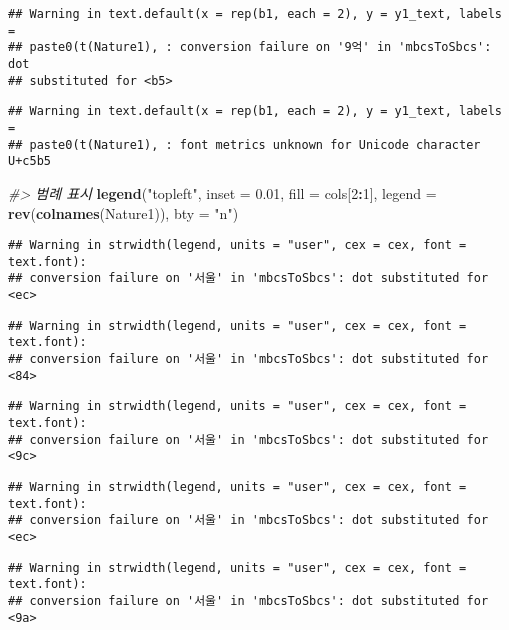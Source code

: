 \documentclass[
]{article}
\newenvironment{Shaded}{\begin{snugshade}}{\end{snugshade}}
\newcommand{\CommentTok}[1]{\textcolor[rgb]{0.56,0.35,0.01}{\textit{#1}}}
\newcommand{\DataTypeTok}[1]{\textcolor[rgb]{0.13,0.29,0.53}{#1}}
\newcommand{\DecValTok}[1]{\textcolor[rgb]{0.00,0.00,0.81}{#1}}
\newcommand{\FloatTok}[1]{\textcolor[rgb]{0.00,0.00,0.81}{#1}}
\newcommand{\KeywordTok}[1]{\textcolor[rgb]{0.13,0.29,0.53}{\textbf{#1}}}
\newcommand{\NormalTok}[1]{#1}
\newcommand{\OperatorTok}[1]{\textcolor[rgb]{0.81,0.36,0.00}{\textbf{#1}}}
\newcommand{\StringTok}[1]{\textcolor[rgb]{0.31,0.60,0.02}{#1}}
\begin{document}
\begin{verbatim}
## Warning in text.default(x = rep(b1, each = 2), y = y1_text, labels =
## paste0(t(Nature1), : conversion failure on '9억' in 'mbcsToSbcs': dot
## substituted for <b5>
\end{verbatim}

\begin{verbatim}
## Warning in text.default(x = rep(b1, each = 2), y = y1_text, labels =
## paste0(t(Nature1), : font metrics unknown for Unicode character U+c5b5
\end{verbatim}

\begin{Shaded}
\begin{Highlighting}[]
\CommentTok{#> 범례 표시}
\KeywordTok{legend}\NormalTok{(}\StringTok{"topleft"}\NormalTok{, }
       \DataTypeTok{inset =} \FloatTok{0.01}\NormalTok{, }
       \DataTypeTok{fill =}\NormalTok{ cols[}\DecValTok{2}\OperatorTok{:}\DecValTok{1}\NormalTok{], }
       \DataTypeTok{legend =} \KeywordTok{rev}\NormalTok{(}\KeywordTok{colnames}\NormalTok{(Nature1)), }
       \DataTypeTok{bty =} \StringTok{"n"}\NormalTok{)}
\end{Highlighting}
\end{Shaded}

\begin{verbatim}
## Warning in strwidth(legend, units = "user", cex = cex, font = text.font):
## conversion failure on '서울' in 'mbcsToSbcs': dot substituted for <ec>
\end{verbatim}

\begin{verbatim}
## Warning in strwidth(legend, units = "user", cex = cex, font = text.font):
## conversion failure on '서울' in 'mbcsToSbcs': dot substituted for <84>
\end{verbatim}

\begin{verbatim}
## Warning in strwidth(legend, units = "user", cex = cex, font = text.font):
## conversion failure on '서울' in 'mbcsToSbcs': dot substituted for <9c>
\end{verbatim}

\begin{verbatim}
## Warning in strwidth(legend, units = "user", cex = cex, font = text.font):
## conversion failure on '서울' in 'mbcsToSbcs': dot substituted for <ec>
\end{verbatim}

\begin{verbatim}
## Warning in strwidth(legend, units = "user", cex = cex, font = text.font):
## conversion failure on '서울' in 'mbcsToSbcs': dot substituted for <9a>
\end{verbatim}
\end{document}

